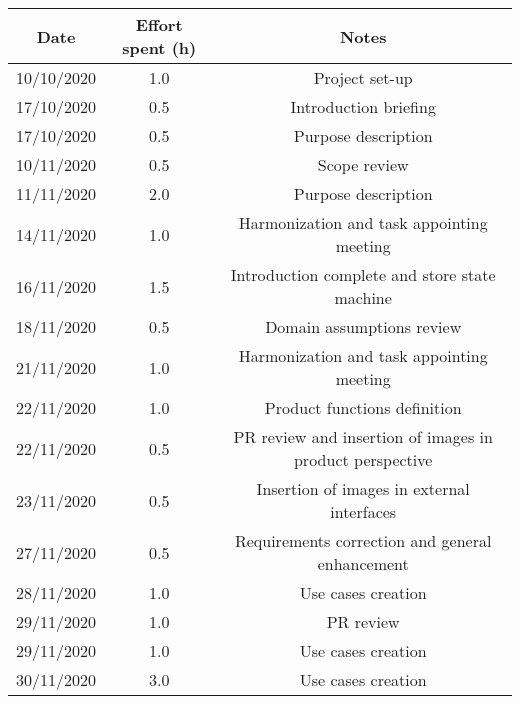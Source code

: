 \documentclass[../../main.tex]{subfiles}
\begin{document}
    \begin{center}
        \begin{tabular}{|c| |c| |c|} 
            \hline
            Date & Effort spent (h) & Notes\\ [0.5ex] 
            \hline\hline
            10/10/2020 & 1.0 & Project set-up\\ 
            17/10/2020 & 0.5 & Introduction briefing\\ 
            17/10/2020 & 0.5 & Purpose description\\ 
            10/11/2020 & 0.5 & Scope review\\
            11/11/2020 & 2.0 & Purpose description\\
            14/11/2020 & 1.0 & Harmonization and task appointing meeting\\
            16/11/2020 & 1.5 & Introduction complete and store state machine\\
            18/11/2020 & 0.5 & Domain assumptions review\\
            21/11/2020 & 1.0 & Harmonization and task appointing meeting\\
            22/11/2020 & 1.0 & Product functions definition\\
            22/11/2020 & 0.5 & PR review and insertion of images in product perspective\\
            23/11/2020 & 0.5 & Insertion of images in external interfaces\\
            27/11/2020 & 0.5 & Requirements correction and general enhancement\\
            28/11/2020 & 1.0 & Use cases creation\\
            29/11/2020 & 1.0 & PR review\\
            29/11/2020 & 1.0 & Use cases creation\\
            30/11/2020 & 3.0 & Use cases creation\\
            \hline
        \end{tabular}
    \end{center}
\end{document}

